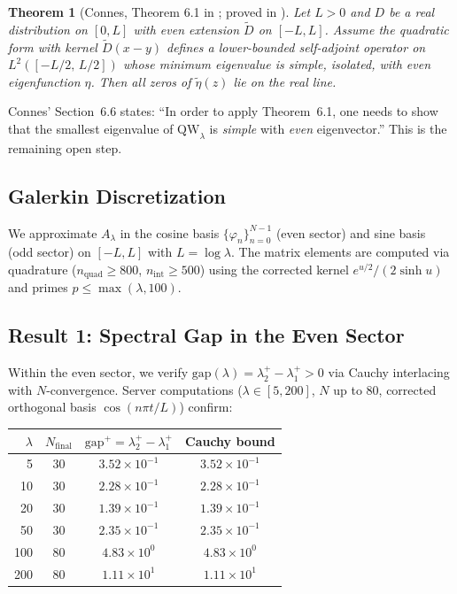 \documentclass[12pt,a4paper]{article}
\newtheorem{theorem}{Theorem}[section]
\theoremstyle{definition}
\theoremstyle{remark}
\begin{document}
\begin{theorem}[Connes, Theorem 6.1 in \cite{Connes2026}; proved in \cite{ConnesvS2025}]
Let $L > 0$ and $D$ be a real distribution on $[0,L]$ with even extension $\tilde{D}$ on $[-L,L]$. Assume the quadratic form with kernel $\tilde{D}(x-y)$ defines a lower-bounded self-adjoint operator on $L^2([-L/2,\,L/2])$ whose minimum eigenvalue is simple, isolated, with even eigenfunction $\eta$. Then all zeros of $\tilde{\eta}(z)$ lie on the real line.
\end{theorem}

\noindent Connes' Section~6.6 states: ``In order to apply Theorem~6.1, one needs to show that the smallest eigenvalue of $\mathrm{QW}_\lambda$ is \emph{simple} with \emph{even} eigenvector.'' This is the remaining open step.

\subsection{Galerkin Discretization}

We approximate $A_\lambda$ in the cosine basis $\{\varphi_n\}_{n=0}^{N-1}$ (even sector) and sine basis (odd sector) on $[-L,L]$ with $L = \log\lambda$. The matrix elements are computed via quadrature ($n_{\mathrm{quad}} \geq 800$, $n_{\mathrm{int}} \geq 500$) using the corrected kernel $e^{u/2}/(2\sinh u)$ and primes $p \leq \max(\lambda, 100)$.

\subsection{Result 1: Spectral Gap in the Even Sector}

Within the even sector, we verify $\mathrm{gap}(\lambda) = \lambda_2^+ - \lambda_1^+ > 0$ via Cauchy interlacing with $N$-convergence. Server computations ($\lambda \in [5,200]$, $N$ up to 80, corrected orthogonal basis $\cos(n\pi t/L)$) confirm:

\medskip
\begin{center}
\renewcommand{\arraystretch}{1.2}
\begin{tabular}{r|c|c|c}
$\lambda$ & $N_{\mathrm{final}}$ & $\mathrm{gap}^+ = \lambda_2^+ - \lambda_1^+$ & Cauchy bound \\\hline
5 & 30 & $3.52\times 10^{-1}$ & $3.52\times 10^{-1}$ \\
10 & 30 & $2.28\times 10^{-1}$ & $2.28\times 10^{-1}$ \\
20 & 30 & $1.39\times 10^{-1}$ & $1.39\times 10^{-1}$ \\
50 & 30 & $2.35\times 10^{-1}$ & $2.35\times 10^{-1}$ \\
100 & 80 & $4.83\times 10^{0}$ & $4.83\times 10^{0}$ \\
200 & 80 & $1.11\times 10^{1}$ & $1.11\times 10^{1}$ \\
\end{tabular}
\end{center}
\end{document}
